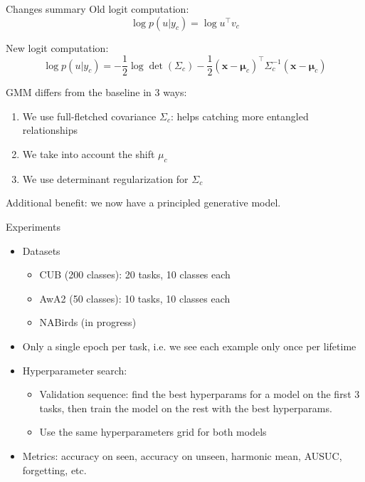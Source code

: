 \documentclass[handout, 10pt]{beamer}
\begin{document}
\begin{frame}{Changes summary}
\pause
Old logit computation:
\[
\log p(u|y_c) = \log u^\top v_c
\]

\pause
New logit computation:
\[
\log p(u|y_c) = -\frac{1}{2} \log \det(\Sigma_c) -\frac{1}{2}(\mathbf{x}-\boldsymbol{\mu}_c)^{\top} \Sigma_c^{-1}(\mathbf{x}-\boldsymbol{\mu}_c)
\]

\pause
GMM differs from the baseline in 3 ways:
    \begin{enumerate}
        \item We use full-fletched covariance $\Sigma_c$: helps catching more entangled relationships
        \item We take into account the shift $\mu_c$
        \item We use determinant regularization for $\Sigma_c$
    \end{enumerate}
    
Additional benefit: we now have a principled generative model.
\end{frame}


\begin{frame}{Experiments}

\begin{itemize}
    \item\pause Datasets
    \begin{itemize}
        \item CUB (200 classes): 20 tasks, 10 classes each
        \item AwA2 (50 classes): 10 tasks, 10 classes each
        \item NABirds (in progress)
    \end{itemize}
    \item\pause Only a single epoch per task, i.e. we see each example only once per lifetime
    \item\pause Hyperparameter search:
    \begin{itemize}
        \item Validation sequence: find the best hyperparams for a model on the first 3 tasks, then train the model on the rest with the best hyperparams.
        \item Use the same hyperparameters grid for both models
    \end{itemize}
    \item\pause Metrics: accuracy on seen, accuracy on unseen, harmonic mean, AUSUC, forgetting, etc.
\end{itemize}
\end{frame}
\end{document}
